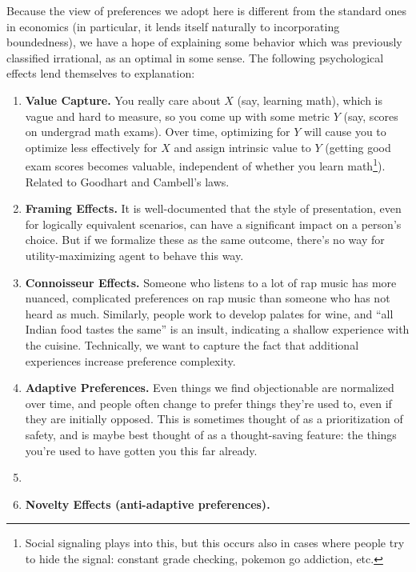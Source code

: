 \documentclass{article}
\begin{document}
	Because the view of preferences we adopt here is different from the standard ones in economics (in particular, it lends itself naturally to incorporating boundedness), we have a hope of explaining some behavior which was previously classified irrational, as an optimal in some sense. The following psychological effects lend themselves to explanation:
	\begin{enumerate}[noitemsep]
		\item \textbf{Value Capture.} You really care about $X$ (say, learning math), which is vague and hard to measure, so you come up with some metric $Y$ (say, scores on undergrad math exams). Over time, optimizing for $Y$ will cause you to optimize less effectively for $X$ and assign intrinsic value to $Y$ (getting good exam scores becomes valuable, independent of whether you learn math\footnote{Social signaling plays into this, but this occurs also in cases where people try to hide the signal: constant grade checking, pokemon go addiction, etc.}). Related to Goodhart and Cambell's laws.
		\item \textbf{Framing Effects.} It is well-documented that the style of presentation, even for logically equivalent scenarios, can have a significant impact on a person's choice. But if we formalize these as the same outcome, there's no way for utility-maximizing agent to behave this way.
		\item \textbf{Connoisseur Effects.} Someone who listens to a lot of rap music has more nuanced, complicated preferences on rap music than someone who has not heard as much. Similarly, people work to develop palates for wine, and ``all Indian food tastes the same'' is an insult, indicating a shallow experience with the cuisine. Technically, we want to capture the fact that additional experiences increase preference complexity.
		
		\item \textbf{Adaptive Preferences.} Even things we find objectionable are normalized over time, and people often change to prefer things they're used to, even if they are initially opposed. This is sometimes thought of as a prioritization of safety, and is maybe best thought of as a thought-saving feature: the things you're used to have gotten you this far already. 
		
		\item \textbf{}
		
		\item \textbf{Novelty Effects (anti-adaptive preferences).} 
		
	\end{enumerate}
\end{document}
